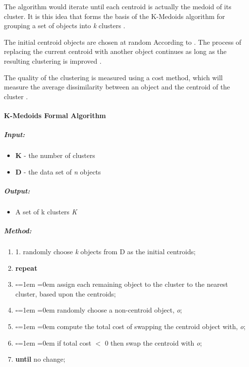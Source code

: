 The algorithm would iterate until each centroid is actually the medoid of its 
cluster. It is this idea that forms the basis of the K-Medoids algorithm for 
grouping a set of objects into {\em k} clusters \citep{everitt74}.

The initial centroid objects are chosen at random According to \citep{tan05}. 
The process of replacing the current centroid with another object continues as 
long as the resulting clustering is improved \citep{tan05}. 

The quality of the clustering is measured using a cost method, which will 
measure the average dissimilarity between an object and the centroid of the 
cluster \citep{tan05}.

\paragraph*{K-Medoids Formal Algorithm}
\subparagraph*{Input:}
\begin{itemize}
  \item {\bf K} - the number of clusters
  \item {\bf D} - the data set of {\em n} objects
\end{itemize}

\subparagraph*{Output:}
\begin{itemize}
  \item A set of k clusters {\em K}
\end{itemize}

\subparagraph*{Method:}
\begin{enumerate}
  \item 1.  randomly choose {\em k} objects from D as the initial centroids;
  \item {\bf repeat}
  \item \begin{list}{$\square$}{\leftmargin=1em \itemindent=0em}
          assign each remaining object to the cluster to the nearest cluster, 
          based upon the centroids;
        \end{list}
  \item \begin{list}{$\square$}{\leftmargin=1em \itemindent=0em}
          randomly choose a non-centroid object, {\em o};
        \end{list}
  \item \begin{list}{$\square$}{\leftmargin=1em \itemindent=0em}
          compute the total cost of swapping the centroid object with, {\em o};
        \end{list}
  \item \begin{list}{$\square$}{\leftmargin=1em \itemindent=0em}
          if total cost $<$ 0 then swap the centroid with {\em o};
        \end{list}
  \item {\bf until} no change;
\end{enumerate}


